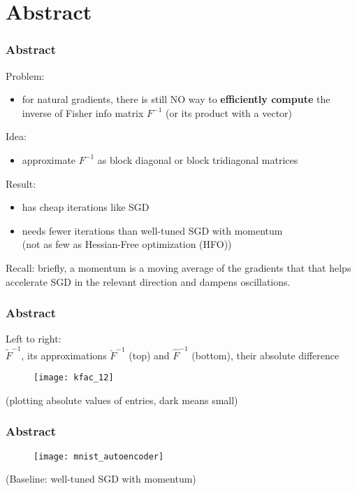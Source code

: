 \section{Abstract}

\begin{frame}
\frametitle{Abstract}

Problem:
\begin{itemize}
    \item for natural gradients, there is still NO way to \textbf{efficiently compute}
        the inverse of Fisher info matrix $F^{-1}$ (or its product with a vector)
\end{itemize}

Idea:
\begin{itemize}
    \item approximate $F^{-1}$ as block diagonal or block tridiagonal matrices
\end{itemize}

Result:
\begin{itemize}
    \item has cheap iterations like SGD
    \item needs fewer iterations than well-tuned SGD with momentum \\
        (not as few as Hessian-Free optimization (HFO))
\end{itemize}

\vspace{10mm}
{\footnotesize
Recall: briefly, a momentum is a moving average of the gradients that
that helps accelerate SGD in the relevant direction and dampens oscillations.
}
\end{frame}

\begin{frame}
\frametitle{Abstract}
{\footnotesize
Left to right: \\
$\tilde{F}^{-1}$, its approximations $\breve{F}^{-1}$ (top) and $\hat{F}^{-1}$ (bottom), their absolute difference
}
\begin{figure}
    \centering
    \texttt{[image: kfac\_12]}
\end{figure}
(plotting absolute values of entries, dark means small)
\end{frame}

\begin{frame}
\frametitle{Abstract}
\begin{figure}
    \centering
    \texttt{[image: mnist\_autoencoder]}
\end{figure}
(Baseline: well-tuned SGD with momentum)
\end{frame}

